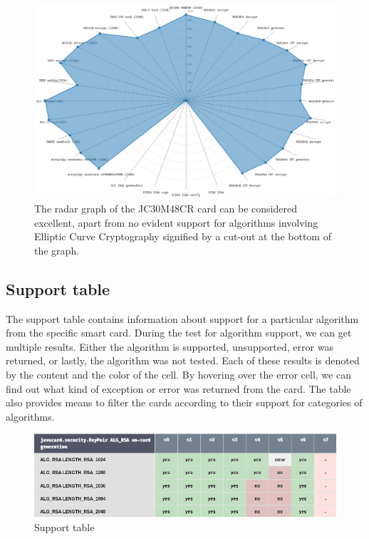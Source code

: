 \begin{figure}[h]
    \centering
    \includegraphics[width=\textwidth]{img/JC30M48CR radar graph.png}
    \caption{
    The radar graph of the JC30M48CR card  can be considered excellent, apart from no evident support for algorithms involving Elliptic Curve Cryptography signified by a cut-out at the bottom of the graph.
    }
    \label{fig:radar-graph}
\end{figure}

\subsection{Support table}
The support table contains information about support for a particular algorithm from the specific smart card. During the test for algorithm support, we can get multiple results. Either the algorithm is supported,  unsupported, error was returned, or lastly, the algorithm was not tested. Each of these results is denoted by the content and the color of the cell. By hovering over the error cell, we can find out what kind of exception or error was returned from the card. The table also provides means to filter the cards according to their support for categories of algorithms.

\begin{figure}[h]
    \centering
    \includegraphics[width=\textwidth]{img/support-table.png}
    \caption{Support table}
    \label{fig:support-table}
\end{figure}

